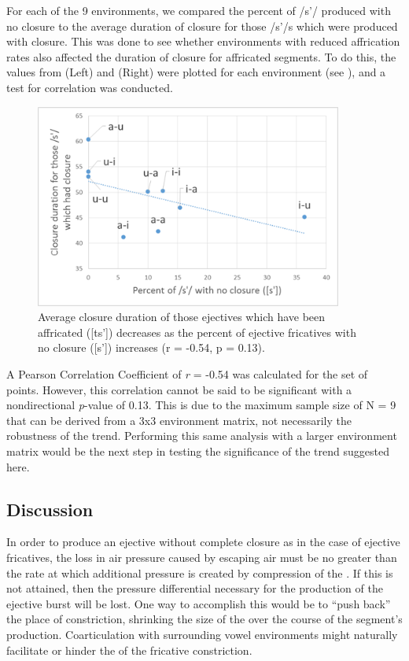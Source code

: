 \documentclass[output=paper
,newtxmath
,modfonts
,nonflat]{langsci/langscibook}
\begin{document}
For each of the 9 environments, we compared the percent of /s’/ produced with no closure to the average duration of closure for those /s’/s which were produced with closure. This was done to see whether environments with reduced affrication rates also affected the duration of closure for affricated segments. To do this, the values from  (Left) and  (Right) were plotted for each environment (see ), and a test for correlation was conducted.

 


\begin{figure}
\includegraphics[width=0.9\textwidth]{figures/fig-moeng-2}
\caption{Average closure duration of those ejectives which have been affricated ([ts’]) decreases as the percent of ejective fricatives with no closure ([s’]) increases (r = -0.54, p = 0.13).}
\label{fig:moeng:3}
\end{figure}

A Pearson Correlation Coefficient of \textit{r} = -0.54 was calculated for the set of points. However, this correlation cannot be said to be significant with a nondirectional \textit{p}{}-value of 0.13. This is due to the maximum sample size of N = 9 that can be derived from a 3x3 environment matrix, not necessarily the robustness of the trend. Performing this same analysis with a larger environment matrix would be the next step in testing the significance of the trend suggested here.

\subsection{Discussion}\label{sec:moeng:5.4}

In order to produce an ejective without complete closure as in the case of ejective fricatives, the loss in air pressure caused by escaping air must be no greater than the rate at which additional pressure is created by compression of the . If this is not attained, then the pressure differential necessary for the production of the ejective burst will be lost. One way to accomplish this would be to “push back” the place of constriction, shrinking the size of the  over the course of the segment’s production. Coarticulation with surrounding vowel environments might naturally facilitate or hinder the  of the fricative constriction. 
\end{document}
